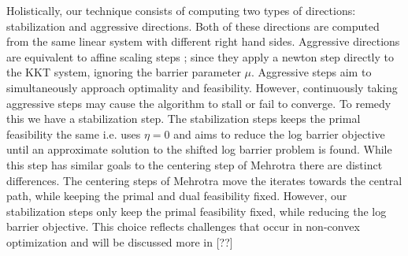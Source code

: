 \documentclass{article}
\begin{document}
Holistically, our technique consists of computing two types of directions: stabilization and aggressive directions. Both of these directions are computed from the same linear system with different right hand sides. Aggressive directions are equivalent to affine scaling steps \cite{mehrotra1992implementation}; since they apply a newton step directly to the KKT system, ignoring the barrier parameter $\mu$. Aggressive steps aim to simultaneously approach optimality and feasibility. However, continuously taking aggressive steps may cause the algorithm to stall or fail to converge. To remedy this we have a stabilization step. The stabilization steps keeps the primal feasibility the same i.e. uses $\eta = 0$ and aims to reduce the log barrier objective until an approximate solution to the shifted log barrier problem is found. While this step has similar goals to the centering step of Mehrotra there are distinct differences. The centering steps of Mehrotra move the iterates towards the central path, while keeping the primal and dual feasibility fixed. However, our stabilization steps only keep the primal feasibility fixed, while reducing the log barrier objective. This choice reflects challenges that occur in non-convex optimization and will be discussed more in [??]
\end{document}

